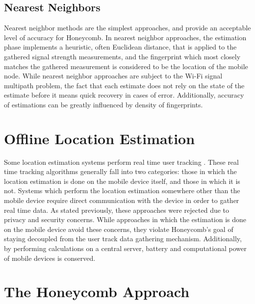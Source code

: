 \subsection{Nearest Neighbors} Nearest neighbor methods \cite{quan2010wi} \cite{nagaosa2012dept} are the simplest approaches, and provide an acceptable level of accuracy for Honeycomb. In nearest neighbor approaches, the estimation phase implements a heuristic, often Euclidean distance, that is applied to the gathered signal strength measurements, and the fingerprint which most closely matches the gathered measurement is considered to be the location of the mobile node. While nearest neighbor approaches are subject to the Wi-Fi signal multipath problem, the fact that each estimate does not rely on the state of the estimate before it means quick recovery in cases of error. Additionally, accuracy of estimations can be greatly influenced by density of fingerprints. 


\section{Offline Location Estimation}

Some location estimation systems perform real time user tracking \cite{bahl2000enhancements} \cite{bahl2000radar} \cite{ito2005bayesian}. These real time tracking algorithms generally fall into two categories: those in which the location estimation is done on the mobile device itself, and those in which it is not. Systems which perform the location estimation somewhere other than the mobile device require direct communication with the device in order to gather real time data. As stated previously, these approaches were rejected due to privacy and security concerns. While approaches in which the estimation is done on the mobile device avoid these concerns, they violate Honeycomb's goal of staying decoupled from the user track data gathering mechanism. Additionally, by performing calculations on a central server, battery and computational power of mobile devices is conserved. 


\section{The Honeycomb Approach}
\label{honeycombapproach}

